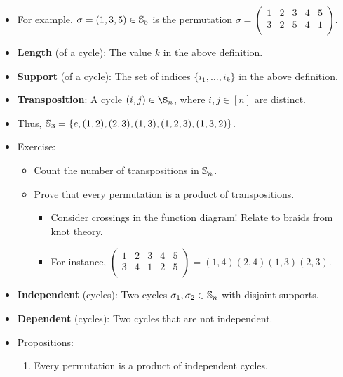 \documentclass[../main.tex]{subfiles}
\begin{document}
\begin{itemize}
    \item For example, $\sigma=(1,3,5)\in\mathbb{S}_5$ is the permutation $
        \sigma=\left(
            \begin{smallmatrix}
                1 & 2 & 3 & 4 & 5\\
                3 & 2 & 5 & 4 & 1\\
            \end{smallmatrix}
        \right)
    $.
    \item \textbf{Length} (of a cycle): The value $k$ in the above definition.
    \item \textbf{Support} (of a cycle): The set of indices $\{i_1,\dots,i_k\}$ in the above definition.
    \item \textbf{Transposition}: A cycle $(i,j)\in\S_n$, where $i,j\in[n]$ are distinct.
    \item Thus, $\mathbb{S}_3=\{e,(1,2),(2,3),(1,3),(1,2,3),(1,3,2)\}$.
    \item Exercise:
    \begin{itemize}
        \item Count the number of transpositions in $\mathbb{S}_n$.
        \item Prove that every permutation is a product of transpositions.
        \begin{itemize}
            \item Consider crossings in the function diagram! Relate to braids from knot theory.
            \item For instance, $
                \left(
                    \begin{smallmatrix}
                        1 & 2 & 3 & 4 & 5\\
                        3 & 4 & 1 & 2 & 5\\
                    \end{smallmatrix}
                \right)=(1,4)(2,4)(1,3)(2,3)
            $.
        \end{itemize}
    \end{itemize}
    \item \textbf{Independent} (cycles): Two cycles $\sigma_1,\sigma_2\in\mathbb{S}_n$ with disjoint supports.
    \item \textbf{Dependent} (cycles): Two cycles that are not independent.
    \item Propositions:
    \begin{enumerate}
        \item Every permutation is a product of independent cycles.
        \begin{itemize}

\end{itemize}
\end{enumerate}
\end{itemize}
\end{document}
